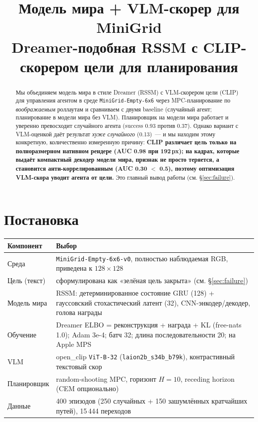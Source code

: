 \documentclass[11pt]{article}
\title{\textbf{Модель мира + VLM-скорер для MiniGrid}\\
\large Dreamer-подобная RSSM с CLIP-скорером цели для планирования}
\author{}
\date{}
\begin{document}
\maketitle

\begin{abstract}
Мы объединяем модель мира в стиле Dreamer (RSSM) с VLM-скорером цели (CLIP) для
управления агентом в среде \texttt{MiniGrid-Empty-6x6} через MPC-планирование по
\emph{воображаемым} роллаутам и сравниваем с двумя baseline (случайный агент;
планирование в модели мира без VLM). Планировщик на модели мира работает и уверенно
превосходит случайного агента (success 0.93 против 0.37). Однако вариант с VLM-оценкой
даёт результат \emph{хуже случайного} (0.13)~--- и мы находим этому конкретную,
количественно измеренную причину: \textbf{CLIP различает цель только на полноразмерном
нативном рендере (AUC 0.98 при 192\,px); на кадрах, которые выдаёт компактный декодер
модели мира, признак не просто теряется, а становится анти-коррелированным
(AUC 0.30 $<$ 0.5), поэтому оптимизация VLM-скора уводит агента от цели.} Это главный
вывод работы (см. \S\ref{sec:failure}).
\end{abstract}

\section{Постановка}
\begin{center}
\begin{tabular}{@{}l p{10.3cm}@{}}
\toprule
Компонент & Выбор \\
\midrule
Среда & \texttt{MiniGrid-Empty-6x6-v0}, полностью наблюдаемая RGB, приведена к $128\times128$ \\
Цель (текст) & сформулирована как «зелёная цель закрыта» (см. \S\ref{sec:failure}) \\
Модель мира & RSSM: детерминированное состояние GRU (128) + гауссовский стохастический латент (32), CNN-энкодер/декодер, голова награды \\
Обучение & Dreamer ELBO = реконструкция + награда + KL (free-nats 1.0); Adam 3e-4; батч 32; длина последовательности 20; на Apple MPS \\
VLM & open\_clip \texttt{ViT-B-32} (\texttt{laion2b\_s34b\_b79k}), контрастивный текстовый скор \\
Планировщик & random-shooting MPC, горизонт $H{=}10$, receding horizon (CEM опционально) \\
Данные & 400 эпизодов (250 случайных + 150 зашумлённых кратчайших путей), 15\,444 переходов \\
\bottomrule
\end{tabular}
\end{center}
\end{document}
